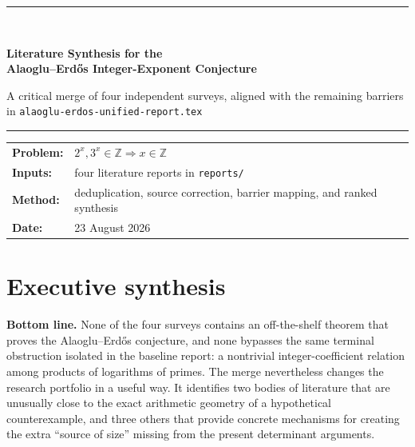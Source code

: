 \documentclass[10pt,letterpaper]{article}
\newcommand{\Z}{\mathbb Z}
\begin{document}
\hypersetup{pageanchor=false}

\begin{titlepage}
\thispagestyle{empty}
\vspace*{0.12\textheight}
{\color{navy}\rule{\textwidth}{1.2pt}}\\[1.1em]
{\fontsize{25}{31}\selectfont\bfseries\color{navy}
Literature Synthesis for the\\[0.18em]
Alaoglu--Erd\H{o}s Integer-Exponent Conjecture\par}
\vspace{1.1em}
{\Large\color{graytext}
A critical merge of four independent surveys, aligned with the remaining barriers in
\texttt{alaoglu-erdos-unified-report.tex}\par}
\vspace{1.25em}
{\color{navy}\rule{\textwidth}{0.55pt}}
\vfill
\begin{tabular}{@{}ll@{}}
\textbf{Problem:} & $2^x,3^x\in\Z \Longrightarrow x\in\Z$\\[0.35em]
\textbf{Inputs:} & four literature reports in \texttt{reports/}\\[0.35em]
\textbf{Method:} & deduplication, source correction, barrier mapping, and ranked synthesis\\[0.35em]
\textbf{Date:} & 23 August 2026
\end{tabular}
\vspace*{0.08\textheight}
\end{titlepage}

\hypersetup{pageanchor=true}
\tableofcontents
\clearpage
{}

\section{Executive synthesis}

\begin{executivebox}
\textbf{Bottom line.}
None of the four surveys contains an off-the-shelf theorem that proves the Alaoglu--Erd\H{o}s
conjecture, and none bypasses the same terminal obstruction isolated in the baseline report:
a nontrivial integer-coefficient relation among products of logarithms of primes.  The merge
nevertheless changes the research portfolio in a useful way.  It identifies two bodies of
literature that are unusually close to the exact arithmetic geometry of a hypothetical
counterexample, and three others that provide concrete mechanisms for creating the extra
``source of size'' missing from the present determinant arguments.
\end{executivebox}
\end{document}
